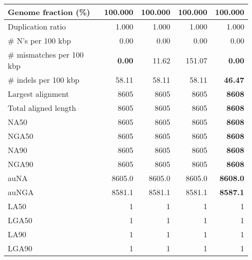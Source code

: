 \documentclass[12pt,a4paper]{article}
\begin{document}
\begin{table}[ht]
\begin{center}
\begin{tabular}{|l*{4}{|r}|}
Genome fraction (\%) & 100.000 & 100.000 & 100.000 & 100.000 \\ \hline
Duplication ratio & 1.000 & 1.000 & 1.000 & 1.000 \\ \hline
\# N's per 100 kbp & 0.00 & 0.00 & 0.00 & 0.00 \\ \hline
\# mismatches per 100 kbp & {\bf 0.00} & 11.62 & 151.07 & {\bf 0.00} \\ \hline
\# indels per 100 kbp & 58.11 & 58.11 & 58.11 & {\bf 46.47} \\ \hline
Largest alignment & 8605 & 8605 & 8605 & {\bf 8608} \\ \hline
Total aligned length & 8605 & 8605 & 8605 & {\bf 8608} \\ \hline
NA50 & 8605 & 8605 & 8605 & {\bf 8608} \\ \hline
NGA50 & 8605 & 8605 & 8605 & {\bf 8608} \\ \hline
NA90 & 8605 & 8605 & 8605 & {\bf 8608} \\ \hline
NGA90 & 8605 & 8605 & 8605 & {\bf 8608} \\ \hline
auNA & 8605.0 & 8605.0 & 8605.0 & {\bf 8608.0} \\ \hline
auNGA & 8581.1 & 8581.1 & 8581.1 & {\bf 8587.1} \\ \hline
LA50 & 1 & 1 & 1 & 1 \\ \hline
LGA50 & 1 & 1 & 1 & 1 \\ \hline
LA90 & 1 & 1 & 1 & 1 \\ \hline
LGA90 & 1 & 1 & 1 & 1 \\ \hline
\end{tabular}
\end{center}
\end{table}
\end{document}
